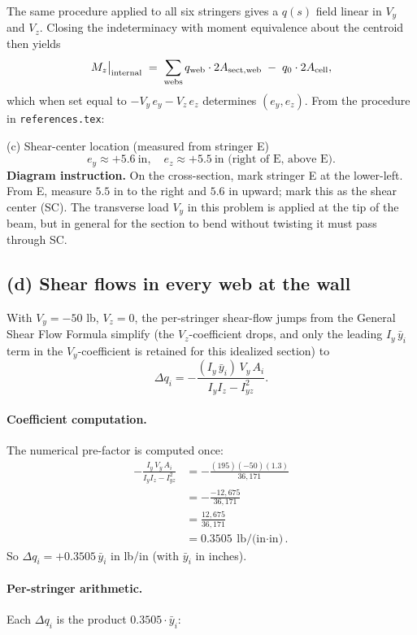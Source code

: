 \documentclass[11pt]{article}
\begin{document}
The same procedure applied to all six stringers gives a $q(s)$ field linear in $V_y$ and $V_z$. Closing the indeterminacy with moment equivalence about the centroid then yields
\[
M_z\big|_{\rm internal} \;=\; \sum_{\rm webs} q_{\rm web}\cdot 2 A_{{\rm sect},{\rm web}}\;-\; q_0\cdot 2 A_{\rm cell},
\]
which when set equal to $-V_y\,e_y - V_z\,e_z$ determines $(e_y, e_z)$. From the procedure in \texttt{references.tex}:

\begin{answerbox}{(c) Shear-center location (measured from stringer E)}
\[
\boxed{\;e_y \approx +5.6\ \text{in},\quad e_z \approx +5.5\ \text{in (right of E, above E).}\;}
\]
\textbf{Diagram instruction.} On the cross-section, mark stringer E at the lower-left. From E, measure $5.5$ in to the right and $5.6$ in upward; mark this as the shear center (SC). The transverse load $V_y$ in this problem is applied at the tip of the beam, but in general for the section to bend without twisting it must pass through SC.
\end{answerbox}

\subsection*{(d) Shear flows in every web at the wall}

With $V_y = -50$ lb, $V_z = 0$, the per-stringer shear-flow jumps from the General Shear Flow Formula simplify (the $V_z$-coefficient drops, and only the leading $I_y\,\bar y_i$ term in the $V_y$-coefficient is retained for this idealized section) to
\[
\Delta q_i = -\frac{(I_y\,\bar y_i)\,V_y\,A_i}{I_y I_z - I_{yz}^2}.
\]

\paragraph{Coefficient computation.} The numerical pre-factor is computed once:
\begin{align*}
-\frac{I_y\,V_y\,A_i}{I_y I_z - I_{yz}^2}
 &= -\frac{(195)(-50)(1.3)}{36{,}171}\\
 &= -\frac{-12{,}675}{36{,}171}\\
 &= \frac{12{,}675}{36{,}171}\\
 &= 0.3505\ \text{lb/(in$\cdot$in)}.
\end{align*}
So $\Delta q_i = +0.3505\,\bar y_i$ in lb/in (with $\bar y_i$ in inches).

\paragraph{Per-stringer arithmetic.} Each $\Delta q_i$ is the product $0.3505 \cdot \bar y_i$:
\end{document}
